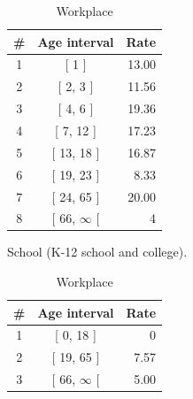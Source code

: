 \begin{table}
    \centering
    \begin{subtable}[b]{0.45\textwidth}
        \centering
        \begin{tabular}{@{}ccr@{}}
            \toprule
            \# & Age interval & Rate \\ \midrule
            1 & {[} 1 {]} & 13.00 \\
            2 & {[} 2, 3 {]} & 11.56 \\
            3 & {[} 4, 6 {]} & 19.36 \\
            4 & {[} 7, 12 {]} & 17.23 \\
            5 & {[} 13, 18 {]} & 16.87 \\
            6 & {[} 19, 23 {]} & 8.33 \\
            7 & {[} 24, 65 {]} & 20.00 \\
            8 & {[} 66, $\infty$ {[} & 4 \\ \bottomrule
        \end{tabular}
        \caption{School (K-12 school and college).}
        \label{tab:age_intervals_school}
    \end{subtable}
    \hfill
    \begin{subtable}[b]{0.45\textwidth}
        \centering
        \begin{tabular}{ccr}
            \hline
            \# & \multicolumn{1}{l}{Age interval} & \multicolumn{1}{l}{Rate} \\ \hline
            1 & {[} 0, 18 {]} & 0 \\
            2 & {[} 19, 65 {]} & 7.57 \\
            3 & {[} 66, $\infty$ {[} & 5.00 \\ \hline
        \end{tabular}
        \caption{Workplace}
        \label{tab:age_intervals_workplace}
    \end{subtable}
    \newline
    \newline
\end{table}
